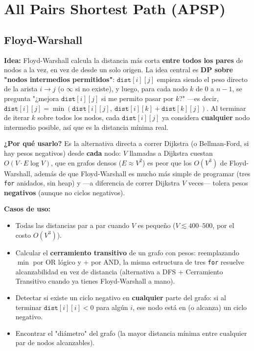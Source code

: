 \documentclass[10pt,a4paper,twocolumn]{article}
\begin{document}
\section{All Pairs Shortest Path (APSP)}
\subsection{Floyd-Warshall}

\textbf{Idea:} Floyd-Warshall calcula la distancia más corta
\textbf{entre todos los pares} de nodos a la vez, en vez de desde un
solo origen. La idea central es \textbf{DP sobre "nodos intermedios
	permitidos"}: $\texttt{dist}[i][j]$ empieza siendo el peso directo de
la arista $i \to j$ (o $\infty$ si no existe), y luego, para cada
nodo $k$ de $0$ a $n-1$, se pregunta "¿mejora $\texttt{dist}[i][j]$
si me permito pasar por $k$?" —es decir,
$\texttt{dist}[i][j] = \min(\texttt{dist}[i][j],\ \texttt{dist}[i][k]
+ \texttt{dist}[k][j])$. Al terminar de iterar $k$ sobre todos los
nodos, cada $\texttt{dist}[i][j]$ ya considera \textbf{cualquier}
nodo intermedio posible, así que es la distancia mínima real.

\textbf{¿Por qué usarlo?} Es la alternativa directa a correr
Dijkstra (o Bellman-Ford, si hay pesos negativos) desde \textbf{cada}
nodo: $V$ llamadas a Dijkstra cuestan $O(V \cdot E \log V)$, que en
grafos densos ($E \approx V^2$) es peor que los $O(V^3)$ de
Floyd-Warshall, además de que Floyd-Warshall es mucho más simple de
programar (tres \texttt{for} anidados, sin heap) y —a diferencia de
correr Dijkstra $V$ veces— tolera pesos \textbf{negativos} (aunque no
ciclos negativos).

\textbf{Casos de uso:}

\begin{itemize}
	\item Todas las distancias par a par cuando $V$ es pequeño
	($V \lesssim 400$–$500$, por el costo $O(V^3)$).
	\item Calcular el \textbf{cerramiento transitivo} de un grafo con
	pesos: reemplazando $\min$ por OR lógico y $+$ por AND, la misma
	estructura de tres \texttt{for} resuelve alcanzabilidad en vez de
	distancia (alternativa a DFS + Cerramiento Transitivo cuando ya
	tienes Floyd-Warshall a mano).
	\item Detectar si existe un ciclo negativo en \textbf{cualquier}
	parte del grafo: si al terminar $\texttt{dist}[i][i] < 0$ para
	algún $i$, ese nodo está en (o alcanza) un ciclo negativo.
	\item Encontrar el "diámetro" del grafo (la mayor distancia
	mínima entre cualquier par de nodos alcanzables).
\end{itemize}
\end{document}

